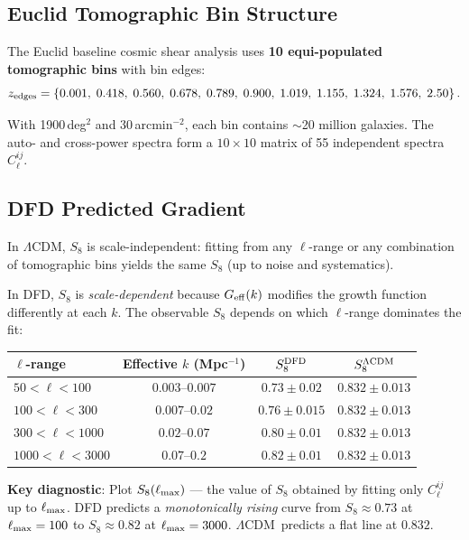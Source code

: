 \documentclass[11pt,a4paper]{article}
\newcommand{\LCDM}{$\Lambda$CDM}
\newcommand{\Geff}{G_{\rm eff}}
\begin{document}
\subsection{Euclid Tomographic Bin Structure}

The Euclid baseline cosmic shear analysis uses \textbf{10 equi-populated
tomographic bins} with bin edges:
\begin{equation}
z_{\rm edges} = \{0.001,\; 0.418,\; 0.560,\; 0.678,\; 0.789,\; 0.900,\;
  1.019,\; 1.155,\; 1.324,\; 1.576,\; 2.50\}\,.
\end{equation}

With 1900\,deg$^2$ and 30\,arcmin$^{-2}$, each bin contains
$\sim$20 million galaxies. The auto- and cross-power spectra form a
$10 \times 10$ matrix of 55 independent spectra $C_\ell^{ij}$.

\subsection{DFD Predicted Gradient}

In \LCDM, $S_8$ is scale-independent: fitting from any $\ell$-range
or any combination of tomographic bins yields the same $S_8$ (up to
noise and systematics).

In DFD, $S_8$ is \emph{scale-dependent} because $\Geff(k)$ modifies
the growth function differently at each $k$. The observable $S_8$
depends on which $\ell$-range dominates the fit:

\begin{center}
\begin{tabular}{lccc}
\toprule
\textbf{$\ell$-range} & \textbf{Effective $k$ (Mpc$^{-1}$)}
  & \textbf{$S_8^{\rm DFD}$} & \textbf{$S_8^{\Lambda{\rm CDM}}$} \\
\midrule
$50 < \ell < 100$   & $0.003$--$0.007$ & $0.73 \pm 0.02$ & $0.832 \pm 0.013$ \\
$100 < \ell < 300$  & $0.007$--$0.02$  & $0.76 \pm 0.015$ & $0.832 \pm 0.013$ \\
$300 < \ell < 1000$ & $0.02$--$0.07$   & $0.80 \pm 0.01$ & $0.832 \pm 0.013$ \\
$1000 < \ell < 3000$ & $0.07$--$0.2$   & $0.82 \pm 0.01$ & $0.832 \pm 0.013$ \\
\bottomrule
\end{tabular}
\end{center}

\textbf{Key diagnostic}: Plot $S_8(\ell_{\rm max})$ --- the value of
$S_8$ obtained by fitting only $C_\ell^{ij}$ up to $\ell_{\rm max}$.
DFD predicts a \emph{monotonically rising} curve from
$S_8 \approx 0.73$ at $\ell_{\rm max} = 100$ to $S_8 \approx 0.82$ at
$\ell_{\rm max} = 3000$. \LCDM\ predicts a flat line at $0.832$.
\end{document}
